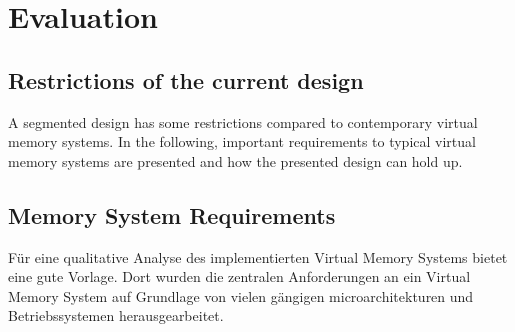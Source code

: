 \chapter{Evaluation}



\section{Restrictions of the current design}
A segmented design has some restrictions compared to contemporary virtual memory
systems. In the following, important requirements to typical virtual memory
systems are presented and how the presented design can hold up.






\label{chap:eval}

\section{Memory System Requirements}
Für eine qualitative Analyse des implementierten Virtual Memory Systems bietet \cite{jacobSoftwaremanagedAddressTranslation1997}
eine gute Vorlage. Dort wurden die zentralen Anforderungen an ein Virtual Memory System auf Grundlage
von vielen gängigen microarchitekturen und Betriebssystemen herausgearbeitet.

